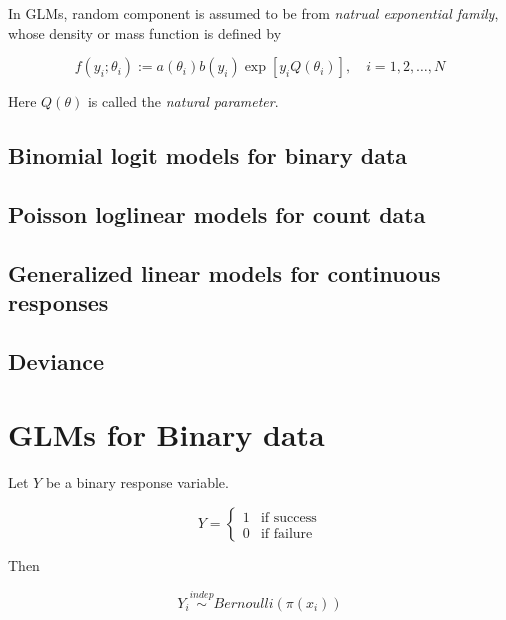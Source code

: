 \documentclass[]{book}
\begin{document}
In GLMs, random component is assumed to be from \emph{natrual exponential family}, whose density or mass function is defined by

\begin{equation}
f(y_i ; \theta_i) := a(\theta_i)b(y_i)\exp[y_iQ(\theta_i)], \quad i = 1, 2, \ldots, N
\end{equation}

Here \(Q(\theta)\) is called the \emph{natural parameter}.

\hypertarget{binomial-logit-models-for-binary-data}{%
\subsection{Binomial logit models for binary data}\label{binomial-logit-models-for-binary-data}}

\hypertarget{poisson-loglinear-models-for-count-data}{%
\subsection{Poisson loglinear models for count data}\label{poisson-loglinear-models-for-count-data}}

\hypertarget{generalized-linear-models-for-continuous-responses}{%
\subsection{Generalized linear models for continuous responses}\label{generalized-linear-models-for-continuous-responses}}

\hypertarget{deviance}{%
\subsection{Deviance}\label{deviance}}

\hypertarget{glms-for-binary-data}{%
\section{GLMs for Binary data}\label{glms-for-binary-data}}

Let \(Y\) be a binary response variable.

\[Y = \begin{cases} 1 & \text{if success} \\ 0 & \text{if failure} \end{cases}\]

Then

\[Y_i \stackrel{indep}{\sim} Bernoulli(\pi(x_i))\]
\end{document}
